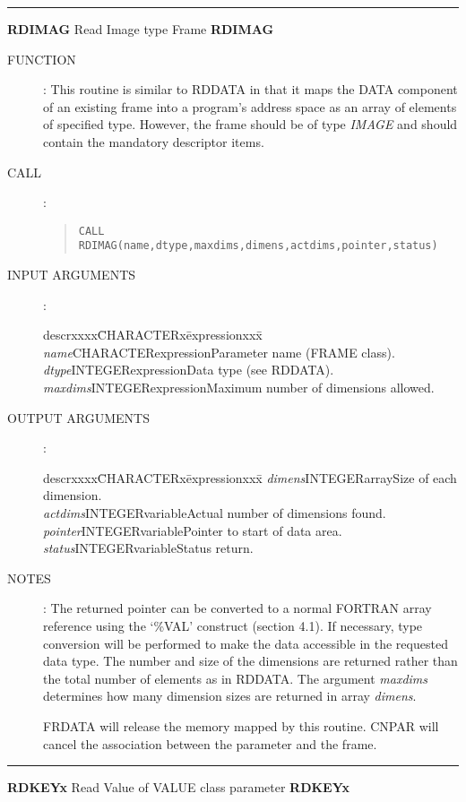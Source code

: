 \documentclass{article}
\begin{document}
\rule{\textwidth}{0.3mm}
{\Large {\bf RDIMAG} \hfill Read Image type Frame \hfill {\bf RDIMAG}}
\begin{description}
\item [FUNCTION]:
This routine is similar to RDDATA in that it maps the DATA component of an
existing frame into a program's address space as an array of elements of
specified type.
However, the frame should be of type {\em IMAGE} and should contain the mandatory
descriptor items.
\item [CALL]:
\begin{quote}
{\tt CALL RDIMAG(name,dtype,maxdims,dimens,actdims,pointer,status)}
\end{quote}
\item [INPUT ARGUMENTS]:
\begin{tabbing}
descrxxxx\=CHARACTERx\=expressionxxx\=\kill
{\em name}\>CHARACTER\>expression\>Parameter name (FRAME class).\\
{\em dtype}\>INTEGER\>expression\>Data type (see RDDATA).\\
{\em maxdims}\>INTEGER\>expression\>Maximum number of dimensions allowed.
\end{tabbing}
\item [OUTPUT ARGUMENTS]:
\begin{tabbing}
descrxxxx\=CHARACTERx\=expressionxxx\=\kill
{\em dimens}\>INTEGER\>array\>Size of each dimension.\\
{\em actdims}\>INTEGER\>variable\>Actual number of dimensions found.\\
{\em pointer}\>INTEGER\>variable\>Pointer to start of data area.\\
{\em status}\>INTEGER\>variable\>Status return.
\end{tabbing}
\item [NOTES]:
The returned pointer can be converted to a normal FORTRAN array reference using
the `\%VAL' construct (section 4.1).
If necessary, type conversion will be performed to make the data accessible in
the requested data type.
The number and size of the dimensions are returned rather than the total number
of elements as in RDDATA.
The argument {\em maxdims} determines how many dimension sizes are returned in
array {\em dimens}.

FRDATA will release the memory mapped by  this routine.
CNPAR will cancel the association between the parameter and the frame.
\end{description}
\rule{\textwidth}{0.3mm}
{\Large {\bf RDKEYx} \hfill Read Value of VALUE class parameter \hfill {\bf RDKEYx}}
\end{document}
